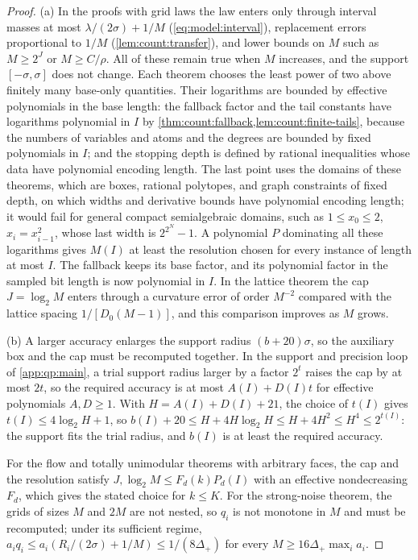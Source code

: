 \begin{proof}
(a) In the proofs with grid laws the law enters only through interval
masses at most $\lambda/(2\sigma)+1/M$ (\cref{eq:model:interval}),
replacement errors proportional to $1/M$ (\cref{lem:count:transfer}), and
lower bounds on $M$ such as $M\ge2^J$ or $M\ge C/\rho$. All of these remain
true when $M$ increases, and the support $[-\sigma,\sigma]$ does not change.
Each theorem chooses the least power of two above finitely many base-only
quantities. Their logarithms are bounded by effective polynomials in the
base length: the fallback factor and the tail constants have logarithms
polynomial in $I$ by \cref{thm:count:fallback,lem:count:finite-tails},
because the numbers of variables and atoms and the degrees are bounded by
fixed polynomials in $I$; and the stopping depth is defined by rational
inequalities whose data have polynomial encoding length. The last point uses
the domains of these theorems, which are boxes, rational polytopes, and
graph constraints of fixed depth, on which widths and derivative bounds
have polynomial encoding length; it would fail for general compact
semialgebraic domains, such as $1\le x_0\le2$, $x_i=x_{i-1}^2$, whose last
width is $2^{2^N}-1$. A polynomial $P$ dominating all these logarithms gives
$M(I)$ at least the resolution chosen for every instance of length at most
$I$. The fallback keeps its base factor, and its polynomial factor in the
sampled bit length is now polynomial in $I$. In the lattice theorem the cap
$J=\log_2M$ enters through a curvature error of order $M^{-2}$ compared with
the lattice spacing $1/[D_0(M-1)]$, and this comparison improves as $M$
grows.

(b) A larger accuracy enlarges the support radius $(b+20)\sigma$, so the
auxiliary box and the cap must be recomputed together. In the support and
precision loop of \cref{app:qp:main}, a trial support radius larger by a
factor $2^t$ raises the cap by at most $2t$, so the required accuracy is at
most $A(I)+D(I)t$ for effective polynomials $A,D\ge1$. With
$H=A(I)+D(I)+21$, the choice of $t(I)$ gives $t(I)\le4\log_2H+1$, so
$b(I)+20\le H+4H\log_2H\le H+4H^2\le H^4\le2^{t(I)}$: the support fits the
trial radius, and $b(I)$ is at least the required accuracy.

For the flow and totally unimodular theorems with arbitrary faces, the cap
and the resolution satisfy $J,\log_2M\le F_d(k)P_d(I)$ with an effective
nondecreasing $F_d$, which gives the stated choice for $k\le K$. For the
strong-noise theorem, the grids of sizes $M$ and $2M$ are not nested, so $q_i$
is not monotone in $M$ and must be recomputed; under its sufficient regime,
$a_iq_i\le a_i(R_i/(2\sigma)+1/M)\le1/(8\Delta_+)$ for every
$M\ge16\Delta_+\max_ia_i$.
\end{proof}

